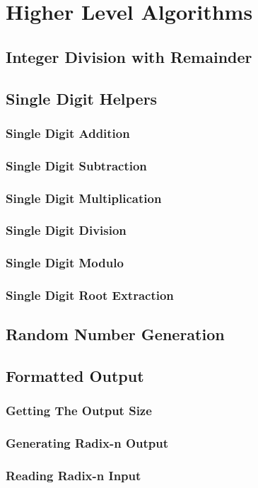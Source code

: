 \documentclass[b5paper]{book}
\begin{document}
\chapter{Higher Level Algorithms}
\section{Integer Division with Remainder}
\section{Single Digit Helpers}
\subsection{Single Digit Addition}
\subsection{Single Digit Subtraction}
\subsection{Single Digit Multiplication}
\subsection{Single Digit Division}
\subsection{Single Digit Modulo}
\subsection{Single Digit Root Extraction}
\section{Random Number Generation}
\section{Formatted Output}
\subsection{Getting The Output Size}
\subsection{Generating Radix-n Output}
\subsection{Reading Radix-n Input}
\end{document}
